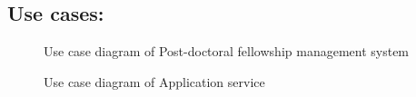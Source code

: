 \documentclass[12pt]{article}
\begin{document}
\subsection{Use cases:}

\begin{figure}[H]
\centering	
{}
\caption{Use case diagram of Post-doctoral fellowship management system}
\end{figure}

\begin{figure}[H]
\centering	
{}
\caption{Use case diagram of Application service}
\end{figure}
\end{document}
